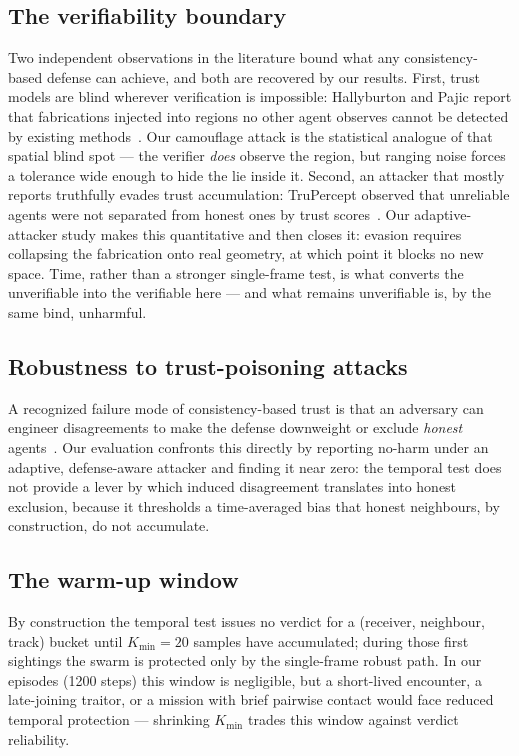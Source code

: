 \subsection{The verifiability boundary}
Two independent observations in the literature bound what any
consistency-based defense can achieve, and both are recovered by our
results. First, trust models are blind wherever verification is impossible:
Hallyburton and Pajic report that fabrications injected into regions no
other agent observes cannot be detected by existing
methods~\cite{aerialtrust2025}. Our camouflage attack is the statistical
analogue of that spatial blind spot --- the verifier \emph{does} observe the
region, but ranging noise forces a tolerance wide enough to hide the lie
inside it. Second, an attacker that mostly reports truthfully evades
trust accumulation: TruPercept observed that unreliable agents were not
separated from honest ones by trust scores~\cite{trupercept2020}. Our
adaptive-attacker study makes this quantitative and then closes it: evasion
requires collapsing the fabrication onto real geometry, at which point it
blocks no new space. Time, rather than a stronger single-frame test, is what
converts the unverifiable into the verifiable here --- and what remains
unverifiable is, by the same bind, unharmful.

\subsection{Robustness to trust-poisoning attacks}
A recognized failure mode of consistency-based trust is that an adversary
can engineer disagreements to make the defense downweight or exclude
\emph{honest} agents~\cite{trustflip2026}.
Our evaluation confronts this directly by reporting no-harm under an
adaptive, defense-aware attacker and finding it near zero: the temporal
test does not provide a lever by which induced disagreement translates into
honest exclusion, because it thresholds a time-averaged bias that honest
neighbours, by construction, do not accumulate.

\subsection{The warm-up window}
By construction the temporal test issues no verdict for a
(receiver, neighbour, track) bucket until $K_{\min}=20$ samples have
accumulated; during those first sightings the swarm is protected only by
the single-frame robust path. In our episodes (1200 steps) this window is
negligible, but a short-lived encounter, a late-joining traitor, or a
mission with brief pairwise contact would face reduced temporal protection
--- shrinking $K_{\min}$ trades this window against verdict reliability.

